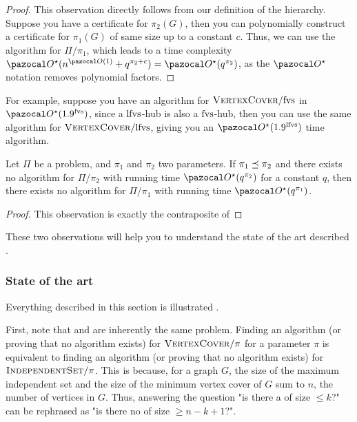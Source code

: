 \begin{proof}
    This observation directly follows from our definition of the hierarchy. Suppose you have a certificate for $\pi_2(G)$, then you can polynomially construct a certificate for $\pi_1(G)$ of same size up to a constant $c$. Thus, we can use the algorithm for $\Pi/\pi_1$, which leads to a time complexity $\O^\star(n^{\O(1)} + q^{\pi_2 + c}) = \O^\star(q^{\pi_2})$, as the $\O^\star$ notation removes polynomial factors. 
\end{proof}

For example, suppose you have an algorithm for $\textsc{VertexCover}/\text{fvs}$ in $\O^\star(1.9^\fvs)$, since a $\text{lfvs}$-hub is also a $\text{fvs}$-hub, then you can use the same algorithm for $\textsc{VertexCover}/\text{lfvs}$, giving you an $\O^\star(1.9^\lfvs)$ time algorithm.

\begin{observation}
    \label{obs:lower_bound}
    Let $\Pi$ be a problem, and $\pi_1$ and $\pi_2$ two parameters. If $\pi_1 \preceq \pi_2$ and there exists no algorithm for $\Pi/\pi_2$ with running time $\O^\star(q^{\pi_2})$ for a constant $q$, then there exists no algorithm for $\Pi/\pi_1$ with running time $\O^\star(q^{\pi_1})$.
\end{observation}

\begin{proof}
    This observation is exactly the contraposite of 
\end{proof}

\medskip

These two observations will help you to understand the state of the art described .

\subsubsection*{State of the art}



Everything described in this section is illustrated .

\medskip

First, note that  and  are inherently the same problem. Finding an algorithm (or proving that no algorithm exists) for $\textsc{VertexCover}/\pi$ for a parameter $\pi$ is equivalent to finding an algorithm (or proving that no algorithm exists) for $\textsc{IndependentSet}/\pi$. This is because, for a graph $G$, the size of the maximum independent set and the size of the minimum vertex cover of $G$ sum to $n$, the number of vertices in $G$. Thus, answering the question "is there a  of size $\leq k$?" can be rephrased as "is there no  of size $\geq n - k + 1$?".

